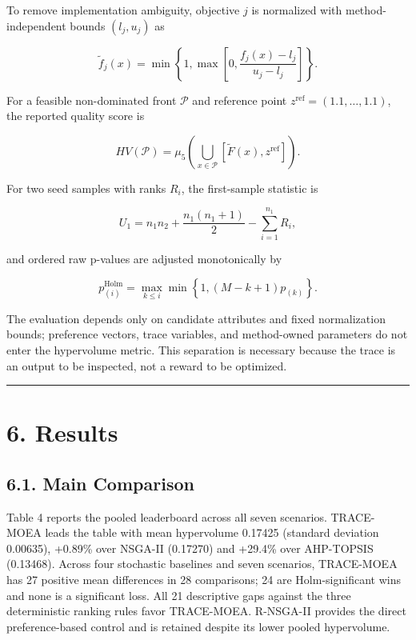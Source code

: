 \documentclass[
  10pt,
  a4paper,
]{article}
\begin{document}
To remove implementation ambiguity, objective \(j\) is normalized with
method-independent bounds \((l_j,u_j)\) as

\[
\tilde f_j(x)=\min\!\left\{1,\max\!\left[0,\frac{f_j(x)-l_j}{u_j-l_j}\right]\right\}.
\]

For a feasible non-dominated front \(\mathcal{P}\) and reference point
\(z^{\mathrm{ref}}=(1.1,\ldots,1.1)\), the reported quality score is

\[
HV(\mathcal{P})=\mu_5\!\left(\bigcup_{x\in\mathcal{P}}[\tilde F(x),z^{\mathrm{ref}}]\right).
\]

For two seed samples with ranks \(R_i\), the first-sample statistic is

\[
U_1=n_1n_2+\frac{n_1(n_1+1)}{2}-\sum_{i=1}^{n_1}R_i,
\]

and ordered raw p-values are adjusted monotonically by

\[
p^{\mathrm{Holm}}_{(i)}=\max_{k\leq i}\min\!\left\{1,(M-k+1)p_{(k)}\right\}.
\]

The evaluation depends only on candidate attributes and fixed
normalization bounds; preference vectors, trace variables, and
method-owned parameters do not enter the hypervolume metric. This
separation is necessary because the trace is an output to be inspected,
not a reward to be optimized.

\begin{center}\rule{0.5\linewidth}{0.5pt}\end{center}

\section{6. Results}\label{results}

\subsection{6.1. Main Comparison}\label{main-comparison}

Table 4 reports the pooled leaderboard across all seven scenarios.
TRACE-MOEA leads the table with mean hypervolume 0.17425 (standard
deviation 0.00635), +0.89\% over NSGA-II (0.17270) and +29.4\% over
AHP-TOPSIS (0.13468). Across four stochastic baselines and seven
scenarios, TRACE-MOEA has 27 positive mean differences in 28
comparisons; 24 are Holm-significant wins and none is a significant
loss. All 21 descriptive gaps against the three deterministic ranking
rules favor TRACE-MOEA. R-NSGA-II provides the direct preference-based
control and is retained despite its lower pooled hypervolume.
\end{document}
